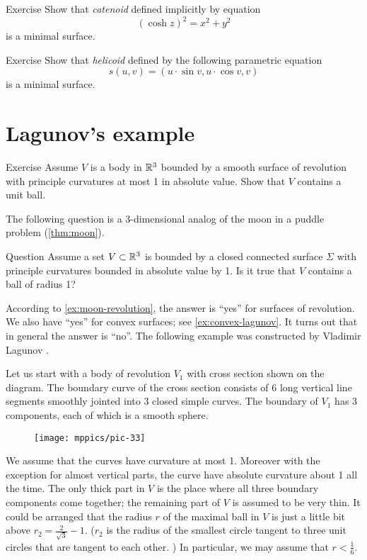 \begin{thm}{Exercise}\label{ex:catenoid-is-minimal}
Show that \emph{catenoid} defined implicitly by equation
\[(\cosh z)^2=x^2+y^2\]
is a minimal surface.
\end{thm}

\begin{thm}{Exercise}\label{ex:helicoid-is-minimal}
Show that \emph{helicoid} defined by the following parametric equation
\[s(u,v)=(u\cdot \sin v,u\cdot \cos v,v)\]
is a minimal surface.
\end{thm}

\section*{Lagunov's example}

\begin{thm}{Exercise}\label{ex:moon-revolution}
Assume $V$ is a body in $\mathbb{R}^3$ bounded by a smooth surface of revolution with principle curvatures at most 1 in absolute value.
Show that $V$ contains a unit ball.
\end{thm}

The following question is a 3-dimensional analog of the moon in a puddle problem (\ref{thm:moon}).

\begin{thm}{Question}\label{quest:lagunov}
Assume a set $V\subset \mathbb{R}^3$ is bounded by a closed connected surface $\Sigma$ with 
principle curvatures bounded in absolute value by 1.
Is it true that $V$ contains a ball of radius 1?
\end{thm}

According to \ref{ex:moon-revolution}, the answer is ``yes'' for surfaces of revolution.
We also have ``yes'' for convex surfaces; see \ref{ex:convex-lagunov}.
It turns out that in general the answer is  ``no''.
The following example was constructed by Vladimir Lagunov \cite{lagunov}.


Let us start with a body of revolution $V_1$ with cross section shown on the diagram.
The boundary curve of the cross section consists of 6 long vertical line segments smoothly jointed into 3 closed simple curves. 
The boundary of $V_1$ has 3 components, each of which is a smooth sphere.

\begin{figure}[h!]%
\centering
\texttt{[image: mppics/pic-33]}
\vskip0mm
\end{figure}

We assume that the curves have curvature at most 1.
Moreover with the exception for almost vertical parts, the curve have absolute curvature about 1 all the time.
The only thick part in $V$ is the place where all three boundary components come together;
the remaining part of $V$ is assumed to be very thin.
It could be arranged that the radius $r$ of the maximal ball in $V$ is just a little bit above 
$r_2=\tfrac2{\sqrt{3}}-1$.
($r_2$ is the radius of the smallest circle tangent to three unit circles that are tangent to each other.%
)
In particular, we may assume that $r<\tfrac16$.


